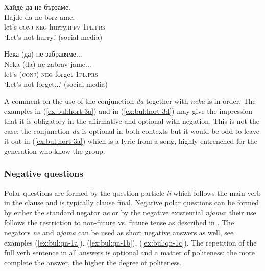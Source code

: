 \documentclass[output=paper,colorlinks=true, citecolor=brown]{langscibook}
\begin{document}
\ex Хайде да не бързаме.\label{ex:bul:hort-3c}\\ 
	\gll Hajde da ne bərz-ame.\\
     let's \textsc{conj}  \textsc{neg} hurry.\textsc{ipfv}-\textsc{1pl.prs}\\
\glt `Let's not hurry.' (social media)

\ex Нека (да) не забравяме... \label{ex:bul:hort-3d}\\ 
	\gll Neka (da) ne zabrav-jame...\\
     let's (\textsc{conj}) \textsc{neg}  forget-\textsc{1pl.prs}\\
\glt `Let's not forget...' (social media)

\z \z 

A comment on the use of the conjunction \textit{da} together with \textit{neka} is in order. The examples in (\ref{ex:bul:hort-3a}) and in (\ref{ex:bul:hort-3d}) may give the impression that it is obligatory in the affirmative and optional with negation. This is not the case: the conjunction \textit{da} is optional in both contexts but it would be odd to leave it out in (\ref{ex:bul:hort-3a}) which is a lyric from a song, highly entrenched for the generation who know the group. 

\subsubsection{Negative questions} \label{sec:bul:negative_questions}
Polar questions are formed by the question particle \textit{li} which follows the main verb in the clause and is typically clause final. Negative polar questions can be formed by either the standard negator \textit{ne} or by the negative existential \textit{njama}; their use follows the restriction to non-future vs. future tense as described in . The negators \textit{ne} and \textit{njama} can be used as short negative answers as well, see examples (\ref{ex:bul:qn-1a}), (\ref{ex:bul:qn-1b}), (\ref{ex:bul:qn-1c}). The repetition of the full verb sentence in all answers is optional and a matter of politeness: the more complete the answer, the higher the degree of politeness.

\end{document}
